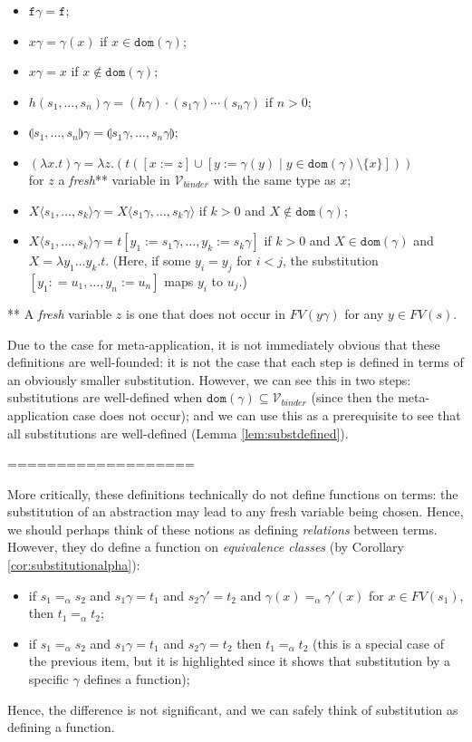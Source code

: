 \documentclass{lmcs}
\theoremstyle{theorem}\newtheorem{theorem}{Theorem}
\theoremstyle{theorem}\newtheorem{lemma}[theorem]{Lemma}
\theoremstyle{theorem}\newtheorem{corollary}[theorem]{Corollary}
\theoremstyle{definition}\newtheorem{definition}[theorem]{Definition}
\theoremstyle{definition}\newtheorem{example}[theorem]{Example}
\newcommand{\Vbound}{\mathcal{V}_{\mathit{binder}}}
\newcommand{\FV}{\mathit{FV}}
\newcommand{\domain}{\mathtt{dom}}
\newcommand{\identifier}[1]{\mathtt{#1}}
\newcommand{\afun}{\identifier{f}}
\newcommand{\avar}{x}
\newcommand{\bvar}{y}
\newcommand{\cvar}{z}
\newcommand{\Avar}{X}
\newcommand{\abs}[2]{\lambda #1.#2}
\newcommand{\meta}[2]{#1\langle#2\rangle}
\newcommand{\tuple}[2]{\llparenthesis #1,\dots,#2 \rrparenthesis}
\begin{document}
\begin{itemize}
\item $\afun\gamma = \afun$;
\item $\avar\gamma = \gamma(\avar)$ if $\avar \in \domain(\gamma)$;
\item $\avar\gamma = \avar$ if $\avar \notin \domain(\gamma)$;
\item $h(s_1,\dots,s_n)\gamma = (h\gamma) \cdot (s_1\gamma) \cdots (s_n\gamma)$
  if $n > 0$;
\item $\tuple{s_1}{s_n}\gamma = \tuple{s_1\gamma}{s_n\gamma}$;
\item $(\abs{\avar}{t})\gamma = \abs{\cvar}{(t ([\avar:=\cvar] \cup [\bvar:=
  \gamma(\bvar) \mid \bvar \in \domain(\gamma) \setminus \{\avar\}]))}$ \\
  for $\cvar$ a \emph{fresh}** variable in $\Vbound$ with the same type as
  $\avar$;
\item $\meta{\Avar}{s_1,\dots,s_k}\gamma = \meta{\Avar}{s_1\gamma,\dots,s_k
  \gamma}$ if $k > 0$ and $\Avar \notin \domain(\gamma)$;
\item $\meta{\Avar}{s_1,\dots,s_k}\gamma = t[\bvar_1:=s_1\gamma,\dots,\bvar_k:=
  s_k\gamma]$ if $k > 0$ and $\Avar \in \domain(\gamma)$ and $\Avar =
  \abs{\bvar_1 \dots \bvar_k}{t}$.
  (Here, if some $\bvar_i = \bvar_j$ for $i < j$, the substitution $[\bvar_1:
  =u_1,\dots,\bvar_n:=u_n]$ maps $\bvar_i$ to $u_j$.)
\end{itemize}
** A \emph{fresh} variable $\cvar$ is one that does not occur in
$\FV(\bvar\gamma)$ for any $\bvar \in \FV(s)$.

Due to the case for meta-application, it is not immediately obvious that these
definitions are well-founded: it is not the case that each step is defined in
terms of an obviously smaller substitution.  However, we can see this in two
steps: substitutions are well-defined when $\domain(\gamma) \subseteq \Vbound$
(since then the meta-application case does not occur); and we can use this as a
prerequisite to see that all substitutions are well-defined (Lemma
\ref{lem:substdefined}).

===================

More critically, these definitions technically do not define functions on terms:
the substitution of an abstraction may lead to any fresh variable being chosen.
Hence, we should perhaps think of these notions as defining \emph{relations}
between terms.  However, they do define a function on \emph{equivalence classes}
(by Corollary \ref{cor:substitutionalpha}):
\begin{itemize}
\item if $s_1 =_\alpha s_2$ and $s_1\gamma = t_1$ and $s_2\gamma' = t_2$ and
  $\gamma(x) =_\alpha \gamma'(x)$ for $x \in \FV(s_1)$, then $t_1 =_\alpha t_2$;
\item if $s_1 =_\alpha s_2$ and $s_1\gamma = t_1$ and $s_2\gamma = t_2$ then
  $t_1 =_\alpha t_2$ (this is a special case of the previous item, but it is
  highlighted since it shows that substitution by a specific $\gamma$ defines a
  function);
\end{itemize}
Hence, the difference is not significant, and we can safely think of
substitution as defining a function.
\end{document}
